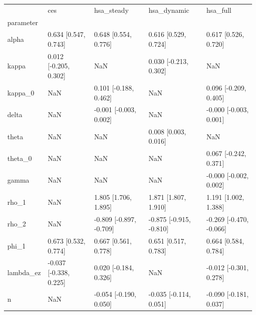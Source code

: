 \begin{tabular}{lllll}
\toprule
 & ces & hsa\_steady & hsa\_dynamic & hsa\_full \\
parameter &  &  &  &  \\
\midrule
alpha & 0.634 [0.547, 0.743] & 0.648 [0.554, 0.776] & 0.616 [0.529, 0.724] & 0.617 [0.526, 0.720] \\
kappa & 0.012 [-0.205, 0.302] & NaN & 0.030 [-0.213, 0.302] & NaN \\
kappa\_0 & NaN & 0.101 [-0.188, 0.462] & NaN & 0.096 [-0.209, 0.405] \\
delta & NaN & -0.001 [-0.003, 0.002] & NaN & -0.000 [-0.003, 0.001] \\
theta & NaN & NaN & 0.008 [0.003, 0.016] & NaN \\
theta\_0 & NaN & NaN & NaN & 0.067 [-0.242, 0.371] \\
gamma & NaN & NaN & NaN & -0.000 [-0.002, 0.002] \\
rho\_1 & NaN & 1.805 [1.706, 1.895] & 1.871 [1.807, 1.910] & 1.191 [1.002, 1.388] \\
rho\_2 & NaN & -0.809 [-0.897, -0.709] & -0.875 [-0.915, -0.810] & -0.269 [-0.470, -0.066] \\
phi\_1 & 0.673 [0.532, 0.774] & 0.667 [0.561, 0.778] & 0.651 [0.517, 0.783] & 0.664 [0.584, 0.784] \\
lambda\_ez & -0.037 [-0.338, 0.225] & 0.020 [-0.184, 0.326] & NaN & -0.012 [-0.301, 0.278] \\
n & NaN & -0.054 [-0.190, 0.050] & -0.035 [-0.114, 0.051] & -0.090 [-0.181, 0.037] \\
\bottomrule
\end{tabular}
